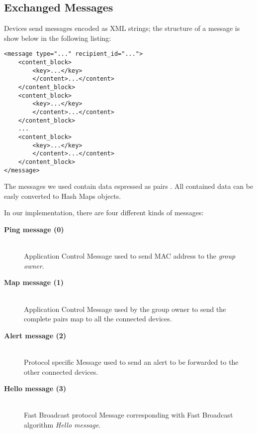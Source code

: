 \subsection{Exchanged Messages}

Devices send messages encoded as XML strings; the structure of a message is show below in the following listing:
\begin{verbatim}
<message type="..." recipient_id="...">
    <content_block>
        <key>...</key>
        </content>...</content>
    </content_block>
    <content_block>
        <key>...</key>
        </content>...</content>
    </content_block>
    ...
    <content_block>
        <key>...</key>
        </content>...</content>
    </content_block>
</message>
\end{verbatim}
The messages we used contain data espressed as pairs . All contained data can be easly converted to Hash Maps objects.

In our implementation, there are four different kinds of messages:
	\begin{description}
		\item[\textbf{Ping message (0)}] \hfill \\
		Application Control Message used to send MAC address to the \textit{group owner}.
		\item[\textbf{Map message (1)}] \hfill \\
		Application Control Message used by the group owner to send the complete  pairs map to all the connected devices.
		\item[\textbf{Alert message (2)}] \hfill \\
		Protocol specific Message used to send an alert to be forwarded to the other connected devices.
		\item[\textbf{Hello message (3)}] \hfill \\
		Fast Broadcast protocol Message corresponding with Fast Broadcast algorithm \textit{Hello message}.
	\end{description}
